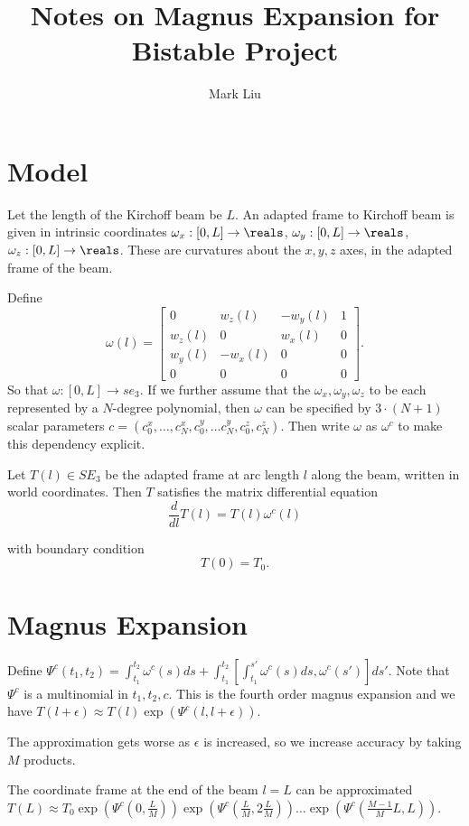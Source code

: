 \documentclass[12pt]{article}
\title{Notes on Magnus Expansion for Bistable Project}
\author{Mark Liu}
\begin{document}
\maketitle

\section{Model}
Let the length of the Kirchoff beam be $L$.
An adapted frame to Kirchoff beam is given in intrinsic coordinates
$\omega_x : [0, L] \rightarrow \reals$,
$\omega_y : [0, L] \rightarrow \reals$,
$\omega_z : [0, L] \rightarrow \reals$. These are curvatures about the $x,y,z$ axes,
in the adapted frame of the beam.

Define
$$\omega(l) = \begin{bmatrix}
                        0 & w_z(l) & -w_y(l) & 1\\
                        w_z(l) & 0 & w_x(l) & 0\\
                        w_y(l) & -w_x(l) & 0 & 0\\
                0 & 0 & 0 & 0 \end{bmatrix}.$$
So that $\omega : [0, L] \rightarrow se_3$.
If we further assume that the $\omega_x, \omega_y, \omega_z$ to be
each represented by a $N$-degree polynomial, then $\omega$ can be
specified by $3 \cdot (N + 1)$ scalar parameters
$c = (c^x_0, \ldots, c^x_N, c^y_0, \ldots c^y_N, c^z_0, c^z_N)$.
Then write $\omega$ as $\omega^c$ to make this dependency explicit.

              
Let $T(l) \in SE_3$ be the adapted frame at arc length $l$ along the beam,
written in world coordinates. Then $T$ satisfies the matrix differential
equation
$$\frac{d}{dl}T(l) = T(l) \omega^c(l)$$

with boundary condition
$$T(0) = T_0.$$

\section{Magnus Expansion}
Define $\Psi^c(t_1, t_2) = \int_{t_1}^{t_2} \omega^c(s) ds + \int_{t_1}^{t_2} [\int_{t_1}^{s'}\omega^c(s) ds, \omega^c(s')]ds'$.
Note that $\Psi^c$ is a multinomial in $t_1, t_2, c$. This is
the fourth order magnus expansion and we have $T(l + \epsilon) \approx T(l)\exp(\Psi^c(l, l+\epsilon))$. 

The approximation gets worse as $\epsilon$ is increased, so we increase
accuracy by taking $M$ products.


The coordinate frame at the end of the beam $l=L$ can be approximated
$T(L) \approx T_0 \exp(\Psi^c(0, \frac{L}{M})) \exp(\Psi^c(\frac{L}{M}, 2\frac{L}{M}))\ldots \exp(\Psi^c(\frac{M-1}{M}L, L))$.
\end{document}
